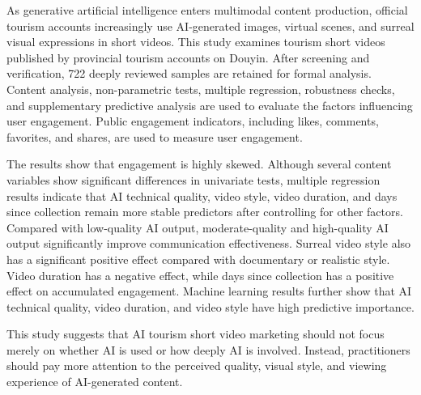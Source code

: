 As generative artificial intelligence enters multimodal content production, official tourism accounts increasingly use AI-generated images, virtual scenes, and surreal visual expressions in short videos. This study examines tourism short videos published by provincial tourism accounts on Douyin. After screening and verification, 722 deeply reviewed samples are retained for formal analysis. Content analysis, non-parametric tests, multiple regression, robustness checks, and supplementary predictive analysis are used to evaluate the factors influencing user engagement. Public engagement indicators, including likes, comments, favorites, and shares, are used to measure user engagement.

The results show that engagement is highly skewed. Although several content variables show significant differences in univariate tests, multiple regression results indicate that AI technical quality, video style, video duration, and days since collection remain more stable predictors after controlling for other factors. Compared with low-quality AI output, moderate-quality and high-quality AI output significantly improve communication effectiveness. Surreal video style also has a significant positive effect compared with documentary or realistic style. Video duration has a negative effect, while days since collection has a positive effect on accumulated engagement. Machine learning results further show that AI technical quality, video duration, and video style have high predictive importance.

This study suggests that AI tourism short video marketing should not focus merely on whether AI is used or how deeply AI is involved. Instead, practitioners should pay more attention to the perceived quality, visual style, and viewing experience of AI-generated content.
